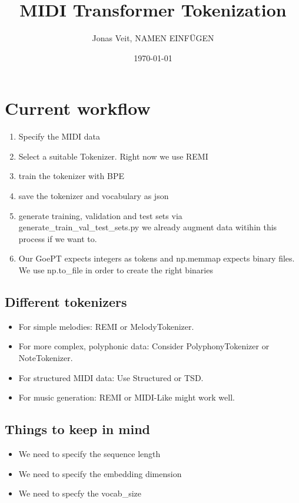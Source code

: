 \documentclass{article}
\title{MIDI Transformer Tokenization}
\author{Jonas Veit, NAMEN EINFÜGEN }
\date{\today}
\begin{document}
    \maketitle
    \section*{Current workflow}
    \begin{enumerate}
        \item Specify the MIDI data
        \item Select a suitable Tokenizer. Right now we use REMI
        \item train the tokenizer with BPE
        \item save the tokenizer and vocabulary as json
        \item generate training, validation and test sets via generate\_train\_val\_test\_sets.py we already augment data witihin this process if we want to.
        \item Our GoePT expects integers as tokens and np.memmap expects binary files. We use np.to\_file in order to create the right binaries
    \end{enumerate}
    
    \subsection*{Different tokenizers}
    \begin{itemize}
        \item For simple melodies: REMI or MelodyTokenizer.
        \item For more complex, polyphonic data: Consider PolyphonyTokenizer or NoteTokenizer.
        \item For structured MIDI data: Use Structured or TSD.
        \item For music generation: REMI or MIDI-Like might work well.
    \end{itemize}

    \subsection*{Things to keep in mind}
    \begin{itemize}
        \item We need to specify the sequence length
        \item We need to specify the embedding dimension
        \item We need to specfy the vocab_size
    \end{itemize}
\end{document}

